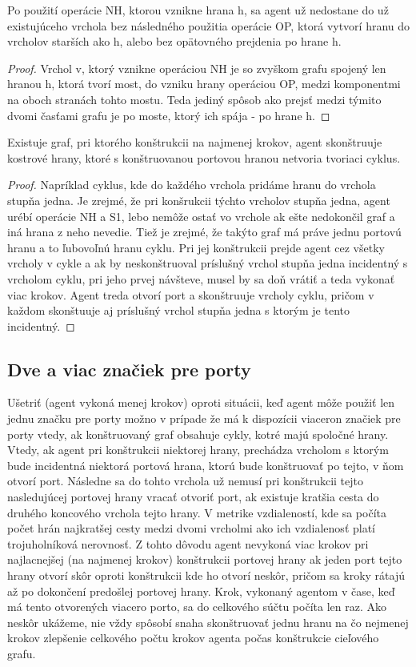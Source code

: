 \begin{lem}
Po použití operácie NH, ktorou vznikne hrana h, sa agent už nedostane do
už existujúceho vrchola bez následného použitia
operácie OP, ktorá vytvorí hranu do vrcholov starších ako h,
alebo bez opätovného prejdenia po hrane h.
\end{lem}
\begin{proof}
Vrchol v, ktorý vznikne operáciou NH je so zvyškom grafu spojený len hranou
h, ktorá tvorí most, do vzniku hrany operáciou OP, medzi komponentmi na oboch
stranách tohto mostu. Teda jediný spôsob ako prejsť medzi týmito dvomi
časťami grafu je po moste, ktorý ich spája - po hrane h.
\end{proof}

\begin{lem}
Existuje graf, pri ktorého konštrukcii na najmenej krokov, agent
skonštruuje kostrové hrany, ktoré s konštruovanou portovou hranou netvoria
tvoriaci cyklus.
\end{lem}
\begin{proof}
Napríklad cyklus, kde do každého vrchola pridáme hranu do vrchola stupňa
jedna. Je zrejmé, že pri konšrukcii týchto vrcholov stupňa jedna, agent
urébí operácie NH a S1, lebo nemôže ostať vo vrchole ak ešte nedokončil graf
a iná hrana z neho nevedie. Tiež je zrejmé, že takýto graf má práve jednu
portovú hranu a to ľubovoľnú hranu cyklu. Pri jej konštrukcii prejde agent
cez všetky vrcholy v cykle a ak by neskonštruoval príslušný vrchol stupňa
jedna incidentný s vrcholom cyklu, pri jeho prvej návšteve, musel by sa doň
vrátiť a teda vykonať viac krokov. Agent treda otvorí port a skonštruuje
vrcholy cyklu, pričom v každom skonštuuje aj príslušný vrchol stupňa jedna s
ktorým je tento incidentný.
\end{proof}


\subsection{Dve a viac značiek pre porty}
Ušetriť (agent vykoná menej krokov) oproti situácii, 
keď agent môže použiť len jednu značku pre porty
možno v prípade že má k dispozícii viaceron značiek pre porty vtedy,
 ak konštruovaný graf obsahuje cykly, kotré majú spoločné hrany.
Vtedy, ak agent pri konštrukcii niektorej hrany, 
prechádza vrcholom s ktorým bude incidentná niektorá
portová
hrana, ktorú bude konštruovať po tejto,
 v ňom otvorí port. Následne sa do tohto vrchola už nemusí pri konštrukcii
tejto nasledujúcej portovej hrany vracať otvoriť port, ak existuje
kratšia cesta do druhého koncového vrchola tejto hrany. V metrike
vzdialeností, kde sa počíta počet hrán najkratšej cesty medzi dvomi vrcholmi
ako ich vzdialenosť platí trojuholníková nerovnosť. Z tohto dôvodu agent
nevykoná viac krokov pri najlacnejšej (na najmenej krokov) 
konštrukcii portovej hrany ak jeden port tejto hrany otvorí skôr oproti
konštrukcii kde ho otvorí neskôr, pričom sa kroky rátajú až po dokončení
predošlej portovej hrany. Krok, vykonaný agentom v čase, keď má tento
otvorených viacero porto, sa do celkového súčtu počíta len raz.
Ako neskôr ukážeme, nie vždy spôsobí snaha skonštruovať jednu hranu na čo
nejmenej krokov zlepšenie celkového počtu krokov agenta počas konštrukcie
cieľového grafu.


